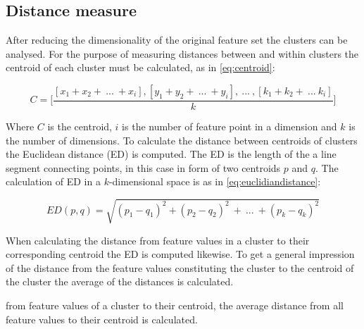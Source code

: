 \subsection{Distance measure} \label{sub:BG:distanceMeasure}
After reducing the dimensionality of the original feature set the clusters can be analysed. For the purpose of measuring distances between and within clusters the centroid of each cluster must be calculated, as in \eqref{eq:centroid}:

\begin{equation} \label{eq:centroid}
	C = \Bigg[ \frac{[x_1+x_2 +~...~+ x_i],[y_1+y_2 +~...~+ y_i] ,~...~,[k_1+k_2 +~...~k_i]}{k} \Bigg]
\end{equation}

Where $C$ is the centroid, $i$ is the number of feature point in a dimension and $k$ is the number of dimensions. To calculate the distance between centroids of clusters the Euclidean distance (ED) is computed. The ED is the length of the a line segment connecting points, in this case in form of two centroids $p$ and $q$. The calculation of ED in a $k$-dimensional space is as in \eqref{eq:euclidiandistance}:

\begin{equation} \label{eq:euclidiandistance}
	ED(p,q) = \sqrt{(p_1-q_1)^2 + (p_2-q_2)^2~+~...~+ (p_k-q_k)^2}
\end{equation} 

When calculating the distance from feature values in a cluster to their corresponding centroid the ED is computed likewise. To get a general impression of the distance from the feature values constituting the cluster to the centroid of the cluster the average of the distances is calculated. 

from feature values of a cluster to their centroid, the average distance from all feature values to their centroid is calculated. 




